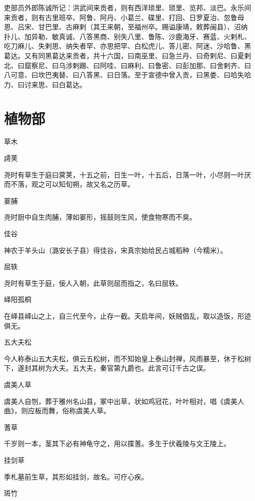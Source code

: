 \documentclass[a4paper,12pt,UTF8,twoside]{ctexbook}
\begin{document}
    吏部员外郎陈诚所记：洪武间来贡者，则有西洋琐里、琐里、览邦、淡巴。永乐间来贡者，则有古里班卒、阿鲁、阿丹、小葛兰、碟里、打回、日罗夏治、忽鲁母恩、吕宋、甘巴里、古麻剌（其王来朝，至福州卒。赐谥康靖，敕葬闽县）、沼纳扑儿、加异勒、敏真诚、八答黑商、别失八里、鲁陈、沙鹿海牙、赛蓝、火剌札、吃刀麻儿、失剌思、纳失者罕、亦思把罕、白松虎儿、答儿密、阿迷、沙哈鲁、黑葛达。又有同黑葛达来贡者，共十六国，曰南巫里、曰急兰丹、曰奇剌尼、曰夏剌北、曰窟察尼、曰乌涉剌踢、曰阿哇、曰麻利、曰鲁密、曰彭加那、曰舍剌齐、曰八可意、曰坎巴夷替、曰八答黑、曰日落。至于宣德中曾入贡，曰黑娄、曰哈失哈力、曰讨来思、曰白葛达。
    
    \part{植物部}
    
    草木
    
    謣荚
    
    尧时有草生于庭曰蓂荚，十五之前，日生一叶，十五后，日落一叶，小尽则一叶厌而不落，观之可以知旬朔，故又名之历草。
    
    翣脯
    
    尧时厨中自生肉脯，薄如翣形，摇鼓则生风，使食物寒而不臭。
    
    佳谷
    
    神农于羊头山（潞安长子县）得佳谷，宋真宗始给民占城稻种（今糯米）。
    
    屈轶
    
    尧时有草生于庭，佞人入朝，此草则屈而指之，名曰屈轶。
    
    峄阳孤桐
    
    在峄县峄山之上，自三代至今，止存一截。天启年间，妖贼倡乱，取以造饭，形迹俱无。
    
    五大夫松
    
    今人称泰山五大夫松，俱云五松树，而不知始皇上泰山封禅，风雨暴至，休于松树下，遂封其树为大夫。五大夫，秦官第九爵也。此言可订千古之误。
    
    虞美人草
    
    虞美人自刎，葬于雅州名山县，冢中出草，状如鸡冠花，叶叶相对，唱《虞美人曲》，则应板而舞，俗称虞美人草。
    
    蓍草
    
    千岁则一本，茎其下必有神龟守之，用以揲蓍。多生于伏羲陵与文王陵上。
    
    挂剑草
    
    季札墓前生草，其形如挂剑，故名。可疗心疾。
    
    斑竹
    
\end{document}
